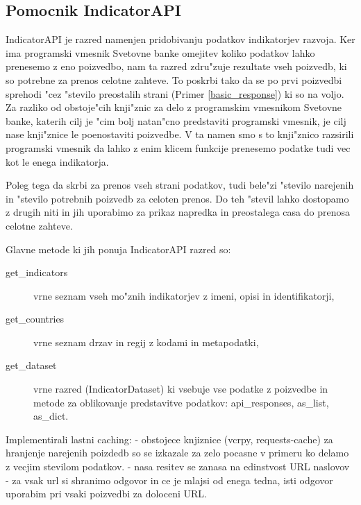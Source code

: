 \subsection{Pomocnik IndicatorAPI}

IndicatorAPI je razred namenjen pridobivanju podatkov indikatorjev razvoja.
Ker ima programski vmesnik Svetovne banke omejitev koliko podatkov lahko
prenesemo z eno poizvedbo, nam ta razred zdru"zuje rezultate vseh poizvedb, ki
so potrebne za prenos celotne zahteve. To poskrbi tako da se po prvi poizvedbi
sprehodi "cez "stevilo preostalih strani (Primer \ref{basic_response}) ki so na voljo. 
Za razliko od obstoje"cih knji"znic
 za delo z programskim vmesnikom
Svetovne banke, katerih cilj je "cim bolj natan"cno predstaviti programski 
vmesnik, je cilj nase knji"znice le poenostaviti poizvedbe. V ta namen smo s to
knji"znico razsirili programski vmesnik da lahko z enim klicem funkcije 
prenesemo podatke tudi vec kot le enega indikatorja.

Poleg tega da skrbi za prenos vseh strani podatkov, tudi bele"zi "stevilo 
narejenih in "stevilo potrebnih poizvedb za celoten prenos. Do teh "stevil lahko
dostopamo z drugih niti in jih uporabimo za prikaz napredka in preostalega
casa do prenosa celotne zahteve.

Glavne metode ki jih ponuja IndicatorAPI razred so:

\begin{description}  
\item [get\_indicators] vrne seznam vseh mo"znih indikatorjev z imeni, opisi in
      identifikatorji,
\item [get\_countries] vrne seznam drzav in regij z kodami in metapodatki,
\item [get\_dataset] vrne razred (IndicatorDataset) ki vsebuje vse podatke z 
      poizvedbe in metode za oblikovanje predstavitve podatkov: api\_responses,
      as\_list, as\_dict.
\end{description}



Implementirali lastni caching:
 - obstojece knjiznice (vcrpy, requests-cache) za hranjenje narejenih poizdedb so se izkazale za zelo
 pocasne v primeru ko delamo z vecjim stevilom podatkov.
 - nasa resitev se zanasa na edinstvost URL naslovov - za vsak url si shranimo odgovor in ce je
 mlajsi od enega tedna, isti odgovor uporabim pri vsaki poizvedbi za doloceni URL.


